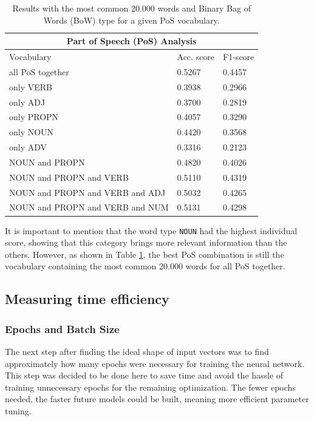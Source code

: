 \begin{table}[H]
\centering
\begin{tabular}{ |p{6.5cm}||p{2cm}|p{2cm}|  }
\hline
\multicolumn{3}{|c|}{Part of Speech (PoS) Analysis}\\
\hline
Vocabulary & Acc. score & F1-score\\
\hline
all PoS together                &   0.5267  &   0.4457\\
only VERB                       &   0.3938  &   0.2966\\
only ADJ                        &   0.3700  &   0.2819\\
only PROPN                      &   0.4057  &   0.3290\\
only NOUN                       &   0.4420  &   0.3568\\
only ADV                        &   0.3316  &   0.2123\\
NOUN and PROPN                  &   0.4820  &   0.4026\\
NOUN and PROPN and VERB         &   0.5110  &   0.4319\\
NOUN and PROPN and VERB and ADJ &   0.5032  &   0.4265\\
NOUN and PROPN and VERB and NUM &   0.5131  &   0.4298\\
\hline
\end{tabular}
\caption{Results with the most common 20.000 words and Binary Bag of Words (BoW) type for a given PoS vocabulary.}
\label{table:Standard_Parameters}
\end{table}

It is important to mention that the word type \texttt{NOUN} had the highest individual score, showing that this category brings more relevant information than the others. However, as shown in Table \ref{table:Standard_Parameters}, the best PoS combination is still the vocabulary containing the most common 20.000 words for all PoS together. 

\subsection{Measuring time efficiency}
\label{chap:Measuring time efficiency}

\subsubsection{Epochs and Batch Size}
\quad The next step after finding the ideal shape of input vectors was to find approximately how many epochs were necessary for training the neural network. This step was decided to be done here to save time and avoid the hassle of training unnecessary epochs for the remaining optimization. The fewer epochs needed, the faster future models could be built, meaning more efficient parameter tuning.

